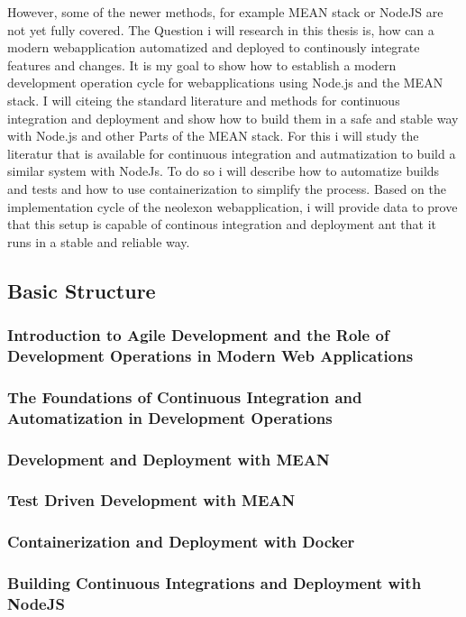 However, some of the newer methods, for example
MEAN stack or NodeJS are not yet fully covered.
The Question i will research in this thesis is, how can a modern webapplication automatized and deployed to continously integrate features and
changes. It is my goal to show how to establish a modern development operation cycle for webapplications using Node.js and the MEAN stack.
I will citeing the standard literature and methods for continuous integration and deployment and show how to build them in a safe and stable
way with Node.js and other Parts of the MEAN stack.
For this i will study the literatur that is available for continuous integration and autmatization to build a similar system with NodeJs.
To do so i will describe how to automatize builds and tests and how to use containerization to simplify the process. Based on the
implementation cycle of the neolexon webapplication, i will provide data to prove that this setup is capable of continous integration and deployment
ant that it runs in a stable and reliable way.

\subsection{Basic Structure}
\subsubsection{Introduction to Agile Development and the Role of Development Operations in Modern Web Applications}
\subsubsection{The Foundations of Continuous Integration and Automatization in Development Operations}
\subsubsection{Development and Deployment with MEAN}
\subsubsection{Test Driven Development with MEAN}
\subsubsection{Containerization and Deployment with Docker}
\subsubsection{Building Continuous Integrations and Deployment with NodeJS}

